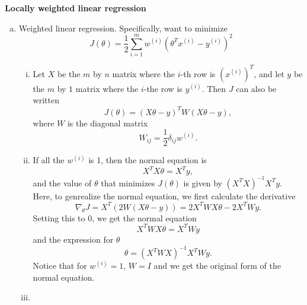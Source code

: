 \documentclass[12pt,letterpaper,boxed]{hmcpset}
\newcommand{\yy}{y^{(i)}}
\newcommand{\xx}{x^{(i)}}
\newcommand{\ww}{w^{(i)}}
\begin{document}
\begin{problem}[Problem 5]
  \textbf{Locally weighted linear regression}
\end{problem}
\begin{solution}
\begin{enumerate}[(a)]
  \item Weighted linear regression. Specifically, want to minimize
  \[
  J(\theta) = \frac{1}{2} \sum_{i=1}^m \ww (\theta^T \xx - \yy)^2
  \]
  \begin{enumerate}[i.]
    \item Let $X$ be the $m$ by $n$ matrix where the $i$-th row is $(\xx)^T$, and let $y$ be the $m$ by $1$ matrix where the $i$-the row is $\yy$. Then $J$ can also be written
    \[
    J(\theta) = (X\theta - y)^T W (X \theta - y),
    \]
    where $W$ is the diagonal matrix
    \[
    W_{ij} = \frac{1}{2} \delta_{ij} \ww.
    \]

    \item If all the $\ww$ is 1, then the normal equation is
    \[
    X^T X \theta = X^T y,
    \]
    and the value of $\theta$ that minimizes $J(\theta)$ is given by $(X^T X)^{-1} X^T y$. Here, to genrealize the normal equation, we first calculate the derivative
    \[
    \nabla_{\theta} J = X^T (2W(X \theta - y)) = 2X^T W X \theta - 2X^T W y.
    \]
    Setting this to 0, we get the normal equation
    \[
    X^T W X \theta = X^T W y
    \]
    and the expression for $\theta$
    \[
    \theta = (X^T W X)^{-1} X^T W y.
    \]
    Notice that for $\ww = 1$, $W = I$ and we get the original form of the normal equation.

    \item
  \end{enumerate}
\end{enumerate}
\end{solution}
\end{document}
